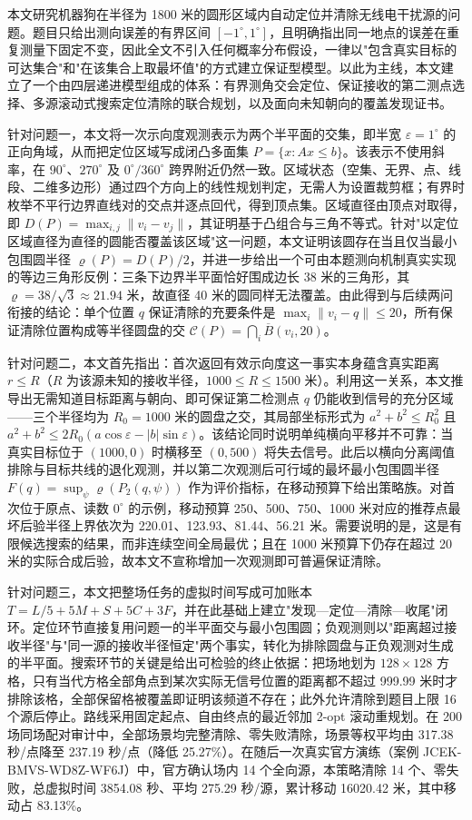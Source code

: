 本文研究机器狗在半径为 1800 米的圆形区域内自动定位并清除无线电干扰源的问题。题目只给出测向误差的有界区间 $[-1^\circ,1^\circ]$，且明确指出同一地点的误差在重复测量下固定不变，因此全文不引入任何概率分布假设，一律以"包含真实目标的可达集合"和"在该集合上取最坏值"的方式建立保证型模型。以此为主线，本文建立了一个由四层递进模型组成的体系：有界测角交会定位、保证接收的第二测点选择、多源滚动式搜索定位清除的联合规划，以及面向未知朝向的覆盖发现证书。

针对问题一，本文将一次示向度观测表示为两个半平面的交集，即半宽 $\varepsilon=1^\circ$ 的正向角域，从而把定位区域写成闭凸多面集 $P=\{x:Ax\le b\}$。该表示不使用斜率，在 $90^\circ$、$270^\circ$ 及 $0^\circ/360^\circ$ 跨界附近仍然一致。区域状态（空集、无界、点、线段、二维多边形）通过四个方向上的线性规划判定，无需人为设置裁剪框；有界时枚举不平行边界直线对的交点并逐点回代，得到顶点集。区域直径由顶点对取得，即 $D(P)=\max_{i,j}\lVert v_i-v_j\rVert$，其证明基于凸组合与三角不等式。针对"以定位区域直径为直径的圆能否覆盖该区域"这一问题，本文证明该圆存在当且仅当最小包围圆半径 $\varrho(P)=D(P)/2$，并进一步给出一个可由本题测向机制真实实现的等边三角形反例：三条下边界半平面恰好围成边长 38 米的三角形，其 $\varrho=38/\sqrt{3}\approx21.94$ 米，故直径 40 米的圆同样无法覆盖。由此得到与后续两问衔接的结论：单个位置 $q$ 保证清除的充要条件是 $\max_i\lVert v_i-q\rVert\le20$，所有保证清除位置构成等半径圆盘的交 $\mathcal{C}(P)=\bigcap_i\overline{B}(v_i,20)$。

针对问题二，本文首先指出：首次返回有效示向度这一事实本身蕴含真实距离 $r\le R$（$R$ 为该源未知的接收半径，$1000\le R\le1500$ 米）。利用这一关系，本文推导出无需知道目标距离与朝向、即可保证第二检测点 $q$ 仍能收到信号的充分区域——三个半径均为 $R_0=1000$ 米的圆盘之交，其局部坐标形式为 $a^2+b^2\le R_0^2$ 且 $a^2+b^2\le2R_0(a\cos\varepsilon-\lvert b\rvert\sin\varepsilon)$。该结论同时说明单纯横向平移并不可靠：当真实目标位于 $(1000,0)$ 时横移至 $(0,500)$ 将失去信号。此后以横向分离阈值排除与目标共线的退化观测，并以第二次观测后可行域的最坏最小包围圆半径 $F(q)=\sup_{\psi}\varrho(P_2(q,\psi))$ 作为评价指标，在移动预算下给出策略族。对首次位于原点、读数 $0^\circ$ 的示例，移动预算 250、500、750、1000 米对应的推荐点最坏后验半径上界依次为 220.01、123.93、81.44、56.21 米。需要说明的是，这是有限候选搜索的结果，而非连续空间全局最优；且在 1000 米预算下仍存在超过 20 米的实际合成后验，故本文不宣称增加一次观测即可普遍保证清除。

针对问题三，本文把整场任务的虚拟时间写成可加账本 $T=L/5+5M+S+5C+3F$，并在此基础上建立"发现—定位—清除—收尾"闭环。定位环节直接复用问题一的半平面交与最小包围圆；负观测则以"距离超过接收半径"与"同一源的接收半径恒定"两个事实，转化为排除圆盘与正负观测对生成的半平面。搜索环节的关键是给出可检验的终止依据：把场地划为 $128\times128$ 方格，只有当代方格全部角点到某次实际无信号位置的距离都不超过 999.99 米时才排除该格，全部保留格被覆盖即证明该频道不存在；此外允许清除到题目上限 16 个源后停止。路线采用固定起点、自由终点的最近邻加 2-opt 滚动重规划。在 200 场同场配对审计中，全部场景均完整清除、零失败清除，场景等权平均由 317.38 秒/点降至 237.19 秒/点（降低 25.27\%）。在随后一次真实官方演练（案例 JCEK-BMVS-WD8Z-WF6J）中，官方确认场内 14 个全向源，本策略清除 14 个、零失败，总虚拟时间 3854.08 秒、平均 275.29 秒/源，累计移动 16020.42 米，其中移动占 83.13\%。

